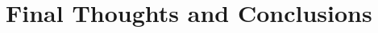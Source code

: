 \chapter{Final Thoughts and Conclusions}\label{chap:final_thoughts}



\let\oldClearpage\clearpage
\let\clearpage\relax
\listoffigures
\listoftables
\let\clearpage\oldClearpage

\printbibliography[heading=bibintoc]



